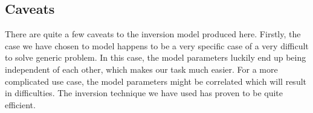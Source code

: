 \subsection{Caveats}
There are quite a few caveats to the inversion model produced here. Firstly, the case we have chosen to model happens to be a very specific case of a very difficult to solve generic problem. In this case, the model parameters luckily end up being independent of each other, which makes our task much easier. For a more complicated use case, the model parameters might be correlated which will result in difficulties. The inversion technique we have used has proven to be quite efficient.
